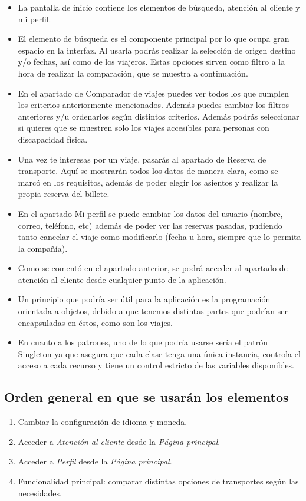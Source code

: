 \begin{itemize}
    \item La pantalla de inicio contiene los elementos de búsqueda, atención al cliente y mi perfil.
    \item El elemento de búsqueda es el componente principal por lo que ocupa gran espacio en la interfaz. Al usarla podrás realizar la selección de origen destino y/o fechas, así como de los viajeros. Estas opciones sirven como filtro a la hora de realizar la comparación, que se muestra a continuación.
    \item En el apartado de Comparador de viajes puedes ver todos los que cumplen los criterios anteriormente mencionados. Además puedes cambiar los filtros anteriores y/u ordenarlos según distintos criterios. Además podrás seleccionar si quieres que se muestren solo los viajes accesibles para personas con discapacidad física.
    \item Una vez te interesas por un viaje, pasarás al apartado de Reserva de transporte. Aquí se mostrarán todos los datos de manera clara, como se marcó en los requisitos, además de poder elegir los asientos y realizar la propia reserva del billete.
    \item En el apartado Mi perfil se puede cambiar los datos del usuario (nombre, correo, teléfono, etc) además de poder ver las reservas pasadas, pudiendo tanto cancelar el viaje como modificarlo (fecha u hora, siempre que lo permita la compañía).
    \item Como se comentó en el apartado anterior, se podrá acceder al apartado de atención al cliente desde cualquier punto de la aplicación.
    \item Un principio que podría ser útil para la aplicación es la programación orientada a objetos, debido a que tenemos distintas partes que podrían ser encapsuladas en éstos, como son los viajes.
    \item En cuanto a los patrones, uno de lo que podría usarse sería el patrón Singleton ya que asegura que cada clase tenga una única instancia, controla el acceso a cada recurso y tiene un control estricto de las variables disponibles.
\end{itemize}

\subsection{Orden general en que se usarán los elementos}

\begin{enumerate}

      \item Cambiar la configuración de idioma y moneda.
      \item Acceder a \textit{Atención al cliente} desde la \textit{Página principal}.
      \item Acceder a \textit{Perfil} desde la \textit{Página principal}.
      \item Funcionalidad principal: comparar distintas opciones de transportes según las
            necesidades.

\end{enumerate}

